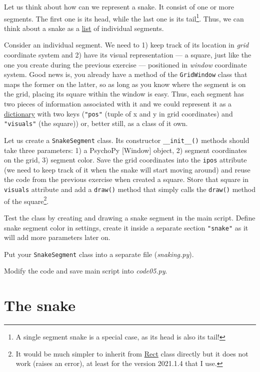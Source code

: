 \documentclass[
]{book}
\begin{document}
Let us think about how can we represent a snake. It consist of one or more segments. The first one is its head, while the last one is its tail\footnote{A single segment snake is a special case, as its head is also its tail!}. Thus, we can think about a snake as a \href{https://docs.python.org/3/tutorial/datastructures.html\#more-on-lists}{list} of individual segments.

Consider an individual segment. We need to 1) keep track of its location in \emph{grid} coordinate system and 2) have its visual representation --- a square, just like the one you create during the previous exercise --- positioned in \emph{window} coordinate system. Good news is, you already have a method of the \texttt{GridWindow} class that maps the former on the latter, so as long as you know where the segment is on the grid, placing its square within the window is easy. Thus, each segment has two pieces of information associated with it and we could represent it as a \href{https://docs.python.org/3/tutorial/datastructures.html\#dictionaries}{dictionary} with two keys (\texttt{"pos"} (tuple of x and y in grid coordinates) and \texttt{"visuals"} (the square)) or, better still, as a class of it own.

Let us create a \texttt{SnakeSegment} class. Its constructor \texttt{\_\_init\_\_()} methods should take three parameters: 1) a PsychoPy {[}Window{]} object, 2) segment coordinates on the grid, 3) segment color. Save the grid coordinates into the \texttt{ipos} attribute (we need to keep track of it when the snake will start moving around) and reuse the code from the previous exercise when created a square. Store that square in \texttt{visuals} attribute and add a \texttt{draw()} method that simply calls the \texttt{draw()} method of the square\footnote{It would be much simpler to inherit from \href{https://psychopy.org/api/visual/rect.html\#psychopy.visual.rect.Rect}{Rect} class directly but it does not work (raises an error), at least for the version 2021.1.4 that I use.}.

Test the class by creating and drawing a snake segment in the main script. Define snake segment color in settings, create it inside a separate section \texttt{"snake"} as it will add more parameters later on.

Put your \texttt{SnakeSegment} class into a separate file (\emph{snaking.py}).

Modify the code and save main script into \emph{code05.py}.

\hypertarget{the-snake-1}{%
\section{The snake}\label{the-snake-1}}
\end{document}
